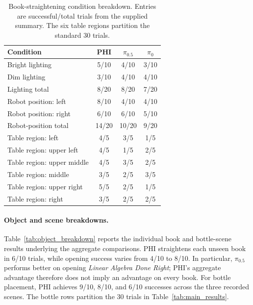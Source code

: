 \documentclass{article}
\begin{document}
\begin{table}[!tbh]
\centering\small
\setlength{\tabcolsep}{7pt}
\renewcommand{\arraystretch}{1.05}
\caption{Book-straightening condition breakdown. Entries are successful/total trials from the supplied summary. The six table regions partition the standard 30 trials.}
\label{tab:additional_conditions}
\begin{tabular}{lccc}
\toprule
\textbf{Condition} & \textbf{PHI} & $\pi_{0.5}$ & $\pi_0$ \\
\midrule
Bright lighting & 5/10 & 4/10 & 3/10 \\
Dim lighting & 3/10 & 4/10 & 4/10 \\
\rowcolor{gray!10} Lighting total & 8/20 & 8/20 & 7/20 \\
Robot position: left & 8/10 & 4/10 & 4/10 \\
Robot position: right & 6/10 & 6/10 & 5/10 \\
\rowcolor{gray!10} Robot-position total & 14/20 & 10/20 & 9/20 \\
\midrule
Table region: left & 4/5 & 3/5 & 1/5 \\
Table region: upper left & 4/5 & 1/5 & 2/5 \\
Table region: upper middle & 4/5 & 3/5 & 2/5 \\
Table region: middle & 3/5 & 2/5 & 3/5 \\
Table region: upper right & 5/5 & 2/5 & 1/5 \\
Table region: right & 3/5 & 2/5 & 2/5 \\
\bottomrule
\end{tabular}
\end{table}

\paragraph{Object and scene breakdowns.}
Table~\ref{tab:object_breakdown} reports the individual book and bottle-scene results underlying the aggregate comparisons. PHI straightens each unseen book in 6/10 trials, while opening success varies from 4/10 to 8/10. In particular, $\pi_{0.5}$ performs better on opening \textit{Linear Algebra Done Right}; PHI's aggregate advantage therefore does not imply an advantage on every book. For bottle placement, PHI achieves 9/10, 8/10, and 6/10 successes across the three recorded scenes. The bottle rows partition the 30 trials in Table~\ref{tab:main_results}.
\end{document}

